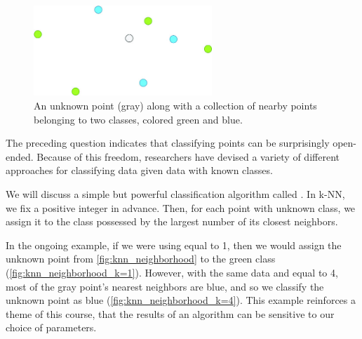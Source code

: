 \begin{qbox}\end{qbox}

\begin{figure}[h]
\centering
\mySfFamily
\includegraphics[width = 0.6\textwidth]{../images_CMYK/knn_neighborhood}
\caption{An unknown point (gray) along with a collection of nearby points belonging to two classes, colored green and blue.}
\label{fig:knn_neighborhood}
\end{figure}

The preceding question indicates that classifying points can be surprisingly open-ended. Because of this freedom, researchers have devised a variety of different approaches for classifying data given data with known classes.

We will discuss a simple but powerful classification algorithm called . In k-NN, we fix a positive integer  in advance. Then, for each point with unknown class, we assign it to the class possessed by the largest number of its  closest neighbors.

In the ongoing example, if we were using  equal to 1, then we would assign the unknown point from \autoref{fig:knn_neighborhood} to the green class (\autoref{fig:knn_neighborhood_k=1}). However, with the same data and  equal to 4, most of the gray point's  nearest neighbors are blue, and so we classify the unknown point as blue (\autoref{fig:knn_neighborhood_k=4}). This example reinforces a theme of this course, that the results of an algorithm can be sensitive to our choice of parameters.\\

